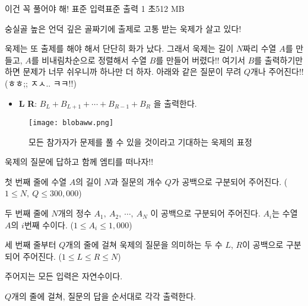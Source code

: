 \begin{problem}{이건 꼭 풀어야 해!}
    {표준 입력}{표준 출력}
    {1 초}{512 MB}{}
    
    숭실골 높은 언덕 깊은 골짜기에 출제로 고통 받는 욱제가 살고 있다!
    
    욱제는 또 출제를 해야 해서 단단히 화가 났다. 그래서 욱제는 길이 $ N $짜리 수열 $ A $를 만들고, $ A $를 비내림차순으로 정렬해서 수열 $ B $를 만들어 버렸다!! 여기서 $ B $를 출력하기만 하면 문제가 너무 쉬우니까 하나만 더 하자. 아래와 같은 질문이 무려 $ Q $개나 주어진다!! (ㅎㅎ;; ㅈㅅ.. ㅋㅋ!!)
    \begin{itemize}
    \item \textbf{L} \textbf{R}: $ B_L + B_{L+1} + \cdots + B_{R-1} + B_R $ 을 출력한다.
    \end{itemize}
    \begin{figure}[h]
        \centering
        \texttt{[image: blobaww.png]}
        \caption{모든 참가자가 문제를 풀 수 있을 것이라고 기대하는 욱제의 표정}
    \end{figure}
    욱제의 질문에 답하고 함께 엠티를 떠나자!!
    
    \InputFile
    첫 번째 줄에 수열 $ A $의 길이 $ N $과 질문의 개수 $ Q $가 공백으로 구분되어 주어진다. ($ 1 \leq N,\ Q \leq 300,000 $)
    
    두 번째 줄에 $ N $개의 정수 $ A_1,\ A_2,\ \cdots,\ A_N $ 이 공백으로 구분되어 주어진다. $ A_i $는 수열 $ A $의 $ i $번째 수이다. ($ 1 \leq A_i \leq 1,000 $)
    
    세 번째 줄부터 $ Q $개의 줄에 걸쳐 욱제의 질문을 의미하는 두 수 $ L $, $ R $이 공백으로 구분되어 주어진다. ($ 1 \leq L \leq R \leq N $)
    
    주어지는 모든 입력은 자연수이다.
    
    \OutputFile
    $ Q $개의 줄에 걸쳐, 질문의 답을 순서대로 각각 출력한다.
    
    \Examples
    
    \begin{example}
    \end{example}
    

\end{problem}
